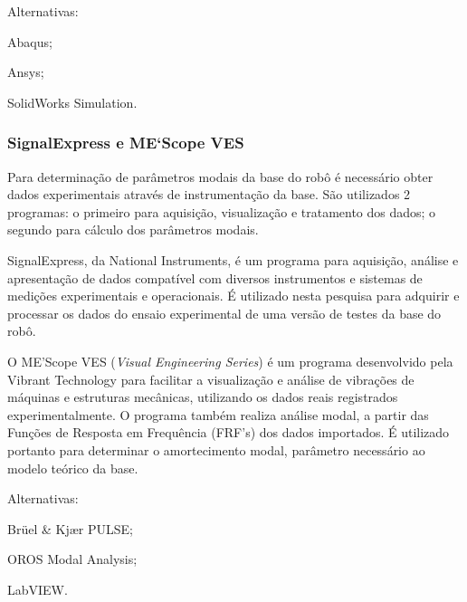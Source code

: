 Alternativas:
%
\begin{enumerate*}
	\item Abaqus;
	\item Ansys;
	\item SolidWorks Simulation.
\end{enumerate*}


\subsubsection{SignalExpress e ME`Scope VES}

Para determinação de parâmetros modais da base do robô é necessário obter dados
experimentais através de instrumentação da base. São utilizados 2 programas: o
primeiro para aquisição, visualização e tratamento dos dados; o segundo para
cálculo dos parâmetros modais.

SignalExpress\cite{signalexpress}, da National Instruments, é um programa para
aquisição, análise e apresentação de dados compatível com diversos instrumentos
e sistemas de medições experimentais e operacionais.
É utilizado nesta pesquisa para adquirir e processar os dados do ensaio
experimental de uma versão de testes da base do robô.

O ME'Scope VES (\textit{Visual Engineering Series})\cite{mescope} é um programa
desenvolvido pela Vibrant Technology para facilitar a visualização e análise de
vibrações de máquinas e estruturas mecânicas, utilizando os dados reais
registrados experimentalmente. O programa também realiza análise modal, a partir
das Funções de Resposta em Frequência (FRF's) dos dados importados. É utilizado
portanto para  determinar o amortecimento modal, parâmetro necessário ao modelo
teórico da base.

Alternativas:
%
\begin{enumerate*}
	\item Brüel \& Kjær PULSE;
	\item OROS Modal Analysis;
	\item LabVIEW.
\end{enumerate*}



